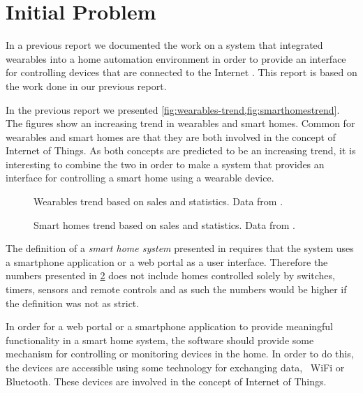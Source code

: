\section{Initial Problem}
\label{sec:initproblem}

In a previous report we documented the work on a system that integrated wearables into a home automation environment in order to provide an interface for controlling devices that are connected to the Internet \cite{prespecialisation}. This report is based on the work done in our previous report.

In the previous report \cite[pp. 1-4]{prespecialisation} we presented \cref{fig:wearables-trend,fig:smarthomestrend}. The figures show an increasing trend in wearables and smart homes. Common for wearables and smart homes are that they are both involved in the concept of Internet of Things. As both concepts are predicted to be an increasing trend, it is interesting to combine the two in order to make a system that provides an interface for controlling a smart home using a wearable device.

\begin{figure}[!hbt]
  \centering
  
  \caption{Wearables trend based on sales and statistics. Data from \protect\cite{WEARABLESTRENDNUMBERS}.}
  \label{fig:wearables-trend}
\end{figure}

\begin{figure}[!hbt]
  \centering
  
  \caption{Smart homes trend based on sales and statistics. Data from \protect\cite{SMARTHOMETREND}.}
  \label{fig:smarthomestrend}
\end{figure}

The definition of a \emph{smart home system} presented in \cite{SMARTHOMETREND} requires that the system uses a smartphone application or a web portal as a user interface. Therefore the numbers presented in \cref{fig:smarthomestrend} does not include homes controlled solely by switches, timers, sensors and remote controls and as such the numbers would be higher if the definition was not as strict.

In order for a web portal or a smartphone application to provide meaningful functionality in a smart home system, the software should provide some mechanism for controlling or monitoring devices in the home. In order to do this, the devices are accessible using some technology for exchanging data, \eg~WiFi or Bluetooth. These devices are involved in the concept of Internet of Things. 

